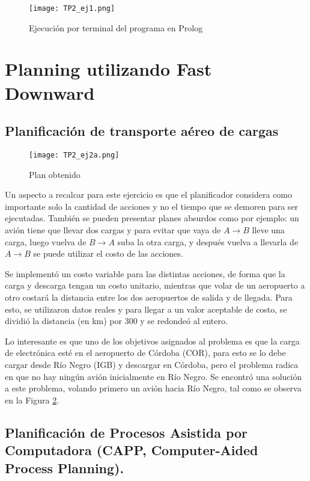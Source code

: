 \documentclass{article}
\begin{document}
\begin{figure}[ht]
    \centering
    \texttt{[image: TP2\_ej1.png]}
    \caption{Ejecución por terminal del programa en Prolog}
    \label{fig:TP2_ej1}
\end{figure}

\section{Planning utilizando Fast Downward}
    
\subsection{Planificación de transporte aéreo de cargas}

\begin{figure}[ht]
    \centering
    \texttt{[image: TP2\_ej2a.png]}
    \caption{Plan obtenido}
    \label{fig:TP2_ej2a}
\end{figure}

Un aspecto a recalcar para este ejercicio es que el planificador considera como importante solo la cantidad de acciones y no el tiempo que se demoren para ser ejecutadas. También se pueden presentar planes absurdos como por ejemplo: un avión tiene que llevar dos cargas y para evitar que vaya de $A \rightarrow B$ lleve una carga, luego vuelva de $B \rightarrow A$ suba la otra carga, y después vuelva a llevarla de $A \rightarrow B$ se puede utilizar el costo de las acciones.

Se implementó un costo variable para las distintas acciones, de forma que la carga y descarga tengan un costo unitario, mientras que volar de un aeropuerto a otro costará la distancia entre los dos aeropuertos de salida y de llegada. Para esto, se utilizaron datos reales y para llegar a un valor aceptable de costo, se dividió la distancia (en km) por 300 y se redondeó al entero.

Lo interesante es que uno de los objetivos asignados al problema es que la carga de electrónica esté en el aeropuerto de Córdoba (COR), para esto se lo debe cargar desde Río Negro (IGB) y descargar en Córdoba, pero el problema radica en que no hay ningún avión inicialmente en Río Negro. Se encontró una solución a este problema, volando primero un avión hacia Río Negro, tal como se observa en la Figura \ref{fig:TP2_ej2a}. 

\subsection{Planificación de Procesos Asistida por Computadora (CAPP, Computer-Aided Process Planning). }
\end{document}
